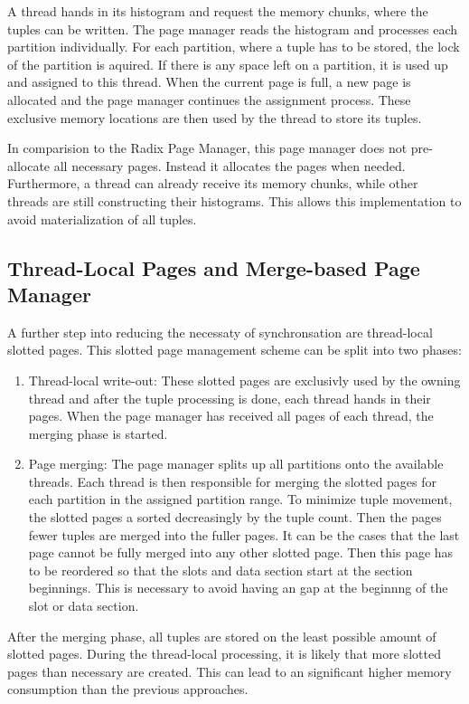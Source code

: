 A thread hands in its histogram and request the memory chunks, where the tuples can be written.
The page manager reads the histogram and processes each partition individually.
For each partition, where a tuple has to be stored, the lock of the partition is aquired.
If there is any space left on a partition, it is used up and assigned to this thread.
When the current page is full, a new page is allocated and the page manager continues the assignment process.
These exclusive memory locations are then used by the thread to store its tuples.

In comparision to the Radix Page Manager, this page manager does not pre-allocate all necessary pages.
Instead it allocates the pages when needed.
Furthermore, a thread can already receive its memory chunks, while other threads are still constructing their histograms.
This allows this implementation to avoid materialization of all tuples.
\subsection{Thread-Local Pages and Merge-based Page Manager}
A further step into reducing the necessaty of synchronsation are thread-local slotted pages.
This slotted page management scheme can be split into two phases:
\begin{enumerate}
  \item Thread-local write-out: These slotted pages are exclusivly used by the owning thread and after the tuple processing is done, each thread hands in their pages.
        When the page manager has received all pages of each thread, the merging phase is started.

  \item Page merging: The page manager splits up all partitions onto the available threads.
        Each thread is then responsible for merging the slotted pages for each partition in the assigned partition range.
        To minimize tuple movement, the slotted pages a sorted decreasingly by the tuple count.
        Then the pages fewer tuples are merged into the fuller pages.
        It can be the cases that the last page cannot be fully merged into any other slotted page.
        Then this page has to be reordered so that the slots and data section start at the section beginnings.
        This is necessary to avoid having an gap at the beginnng of the slot or data section.
\end{enumerate}
After the merging phase, all tuples are stored on the least possible amount of slotted pages.
During the thread-local processing, it is likely that more slotted pages than necessary are created.
This can lead to an significant higher memory consumption than the previous approaches.
